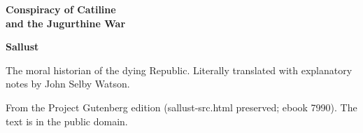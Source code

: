 \documentclass[11pt,letterpaper]{article}
\begin{document}
\color{ink}

\begin{titlepage}
\centering
\vspace*{4em}
{\LARGE\bfseries\color{heading} Conspiracy of Catiline\\[0.3em]and the Jugurthine War\par}
\vspace{2em}
{\Large\bfseries\color{heading} Sallust\par}
\vspace{2.5em}
{\itshape\color{subhead}\parbox{0.8\linewidth}{\centering The moral historian of the dying Republic. Literally translated with explanatory notes by John Selby Watson.\par}}
\vfill
{\small From the Project Gutenberg edition (sallust-src.html preserved; ebook 7990). The text is in the public domain.\par}
\vspace{2em}
\end{titlepage}

\tableofcontents


\end{document}
